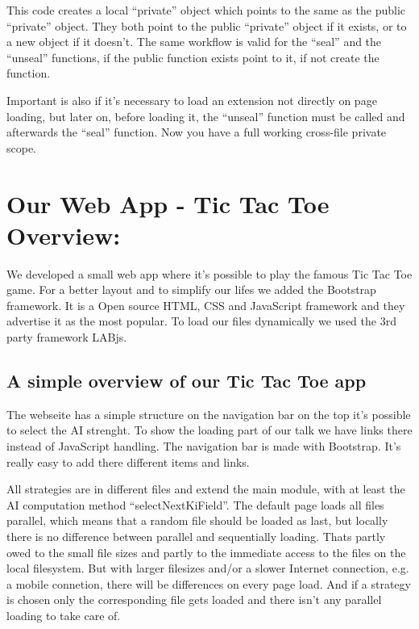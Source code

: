 \documentclass{bioinfo}
\begin{document}
This code creates a local ``private'' object which points to the same as the public ``private''
object. They both point to the public ``private'' object if it exists, or to a new object if it doesn't.
The same workflow is valid for the ``seal'' and the ``unseal'' functions, if the public function
exists point to it, if not create the function. \vspace{\baselineskip}

Important is also if it's necessary to load an extension not directly on page loading, but
later on, before loading it, the ``unseal'' function must be called and afterwards the
``seal'' function. Now you have a full working cross-file private scope.

\section{Our Web App - Tic Tac Toe Overview:}
We developed a small web app where it's possible to play the famous Tic Tac Toe game.
For a better layout and to simplify our lifes we added the Bootstrap framework. It is
a Open source HTML, CSS and JavaScript framework and they advertise it as the most popular.
To load our files dynamically we used the 3rd party framework LABjs.

\subsection{A simple overview of our Tic Tac Toe app}
The webseite has a simple structure on the navigation bar on the top it's possible to select
the AI strenght. To show the loading part of our talk we have links there instead of JavaScript
handling. The navigation bar is made with Bootstrap. It's really easy to add there
different items and links. \vspace{\baselineskip}

All strategies are in different files and extend the main module, with at least the AI computation method ``selectNextKiField''.
The default page loads all files parallel, which means that a random file should be loaded as last,
but locally there is no difference between
parallel and sequentially loading. Thats partly owed to the small file sizes and partly
to the immediate access to the files on the local filesystem. But with larger filesizes
and/or a slower Internet connection, e.g. a mobile connetion, there will be differences
on every page load. And if a strategy is chosen only the corresponding
file gets loaded and there isn't any parallel loading to take care of. \vspace{\baselineskip}
\end{document}
